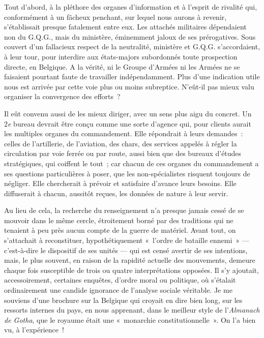 \documentclass[french,twoside]{book} %
\begin{document}
Tout d’abord, à la pléthore des organes d’information et à l’esprit de rivalité qui, conformément à un fâcheux penchant, sur lequel nous aurons à revenir, s’établissait presque fatalement entre eux. Les attachés militaires dépendaient non du G.Q.G., mais du ministère, éminemment jaloux de ses prérogatives. Sous couvert d’un fallacieux respect de la neutralité, ministère et G.Q.G. s’accordaient, à leur tour, pour interdire aux états-majors subordonnés toute prospection directe, en Belgique. A la vérité, ni le Groupe d’Armées ni les Armées ne se faisaient pourtant faute de travailler indépendamment. Plus d’une indication utile nous est arrivée par cette voie plus ou moins subreptice. N’eût-il pas mieux valu organiser la convergence des efforts ?\par
Il eût convenu aussi de les mieux diriger, avec un sens plus aigu du concret. Un 2\emph{e} bureau devrait être conçu comme une sorte d’agence qui, pour clients aurait les multiples organes du commandement. Elle répondrait à leurs demandes : celles de l’artillerie, de l’aviation, des chars, des services appelés à régler la circulation par voie ferrée ou par route, aussi bien que des bureaux d’études stratégiques, qui coiffent le tout ; car chacun de ces organes du commandement a ses questions particulières à poser, que les non-spécialistes risquent toujours de négliger. Elle chercherait à prévoir et satisfaire d’avance leurs besoins. Elle diffuserait à chacun, aussitôt reçues, les données de nature à leur servir.\par
Au lieu de cela, la recherche du renseignement n’a presque jamais cessé de se mouvoir dans le même cercle, étroitement borné par des traditions qui ne tenaient à peu près aucun compte de la guerre de matériel. Avant tout, on s’attachait à reconstituer, hypothétiquement « l’ordre de bataille ennemi » — c’est-à-dire le dispositif de ses unités — qui est   censé avertir de ses intentions, mais, le plus souvent, en raison de la rapidité actuelle des mouvements, demeure chaque fois susceptible de trois ou quatre interprétations opposées. Il s’y ajoutait, accessoirement, certaines enquêtes, d’ordre moral ou politique, où s’étalait ordinairement une candide ignorance de l’analyse sociale véritable. Je me souviens d’une brochure sur la Belgique qui croyait en dire bien long, sur les ressorts internes du pays, en nous apprenant, dans le meilleur style de l’\emph{Almanach de Gotha}, que le royaume était une « monarchie constitutionnelle ». On l’a bien vu, à l’expérience !\par
\end{document}

